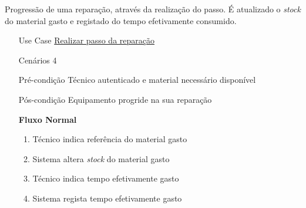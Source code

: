 \documentclass[../relatorio.tex]{subfiles}
\begin{document}
Progressão de uma reparação, através da realização do passo.
É atualizado o \textit{stock} do material gasto e registado do tempo efetivamente consumido.
\begin{itemize}
    \item[Use Case] {\underline{Realizar passo da reparação}}
    \item[Cenários] {4}
    \item[Pré-condição] {Técnico autenticado e material necessário disponível}
    \item[Pós-condição] {Equipamento progride na sua reparação}
          \begin{flushleft}
              \textbf{Fluxo Normal}
          \end{flushleft}
          \begin{enumerate}
              \item Técnico indica referência do material gasto
              \item Sistema altera \textit{stock} do material gasto
              \item Técnico indica tempo efetivamente gasto
              \item Sistema regista tempo efetivamente gasto
          \end{enumerate}
\end{itemize}
\end{document}
